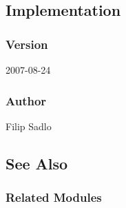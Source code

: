 \subsection{Implementation}


\subsubsection{Version}

2007-08-24


\subsubsection{Author}

Filip Sadlo


\subsection{See Also}


\subsubsection{Related Modules}
